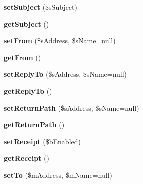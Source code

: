 \begin{DoxyCompactItemize}
\item 
\hypertarget{class_mail_aed13383c939c3d0ae20085b3dfead262}{{\bfseries set\-Subject} (\$s\-Subject)}\label{class_mail_aed13383c939c3d0ae20085b3dfead262}

\item 
\hypertarget{class_mail_ae589342450d2ef29194a98d78aa8aa21}{{\bfseries get\-Subject} ()}\label{class_mail_ae589342450d2ef29194a98d78aa8aa21}

\item 
\hypertarget{class_mail_a20b94131ad2d792d9853b6a2a221cc47}{{\bfseries set\-From} (\$s\-Address, \$s\-Name=null)}\label{class_mail_a20b94131ad2d792d9853b6a2a221cc47}

\item 
\hypertarget{class_mail_a804ebd857d369389880f093540b78015}{{\bfseries get\-From} ()}\label{class_mail_a804ebd857d369389880f093540b78015}

\item 
\hypertarget{class_mail_a34266919afa5cacc20448ecc2d5e9e01}{{\bfseries set\-Reply\-To} (\$s\-Address, \$s\-Name=null)}\label{class_mail_a34266919afa5cacc20448ecc2d5e9e01}

\item 
\hypertarget{class_mail_a0e96ca2c11523c1cc5cbec4c9fa9adb4}{{\bfseries get\-Reply\-To} ()}\label{class_mail_a0e96ca2c11523c1cc5cbec4c9fa9adb4}

\item 
\hypertarget{class_mail_a24a89cf6bb27d9c0d6ba722f296eaea4}{{\bfseries set\-Return\-Path} (\$s\-Address, \$s\-Name=null)}\label{class_mail_a24a89cf6bb27d9c0d6ba722f296eaea4}

\item 
\hypertarget{class_mail_ab5c961d70858efbd1ef097031954ec62}{{\bfseries get\-Return\-Path} ()}\label{class_mail_ab5c961d70858efbd1ef097031954ec62}

\item 
\hypertarget{class_mail_a3bbc70045ccd230a33095af68ca97d90}{{\bfseries set\-Receipt} (\$b\-Enabled)}\label{class_mail_a3bbc70045ccd230a33095af68ca97d90}

\item 
\hypertarget{class_mail_a32ffa8488529c5c95389f1de585f469e}{{\bfseries get\-Receipt} ()}\label{class_mail_a32ffa8488529c5c95389f1de585f469e}

\item 
\hypertarget{class_mail_aba82e52a07b2c987c01966f9665a6a3f}{{\bfseries set\-To} (\$m\-Address, \$m\-Name=null)}\label{class_mail_aba82e52a07b2c987c01966f9665a6a3f}


\end{DoxyCompactItemize}
